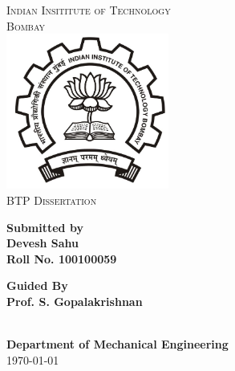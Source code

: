 \documentclass[a4paper,12pt]{report}
\begin{document}
\begin{center}
\textsc{\LARGE Indian Insititute of Technology\\[0.2cm]Bombay }\\[1.5cm]
\includegraphics[width=0.4\textwidth]{./iitbblacklogo.jpg}~\\[2cm]
\textsc{\Large BTP Dissertation}\\[1.5cm]
\begin{minipage}{0.4\textwidth}
\begin{flushleft}
\textbf{Submitted by\\Devesh Sahu\\
Roll No. 100100059\\}
\end{flushleft}
\end{minipage}
\begin{minipage}{0.4\textwidth}
\begin{flushright}
\textbf{Guided By\\Prof. S. Gopalakrishnan}
\end{flushright}
\end{minipage}
\\[1.5cm]
{\large \textbf{Department of Mechanical Engineering}}\\[0.5cm]
{\large \today}\\[0.5cm]
\end{center}
\end{document}
